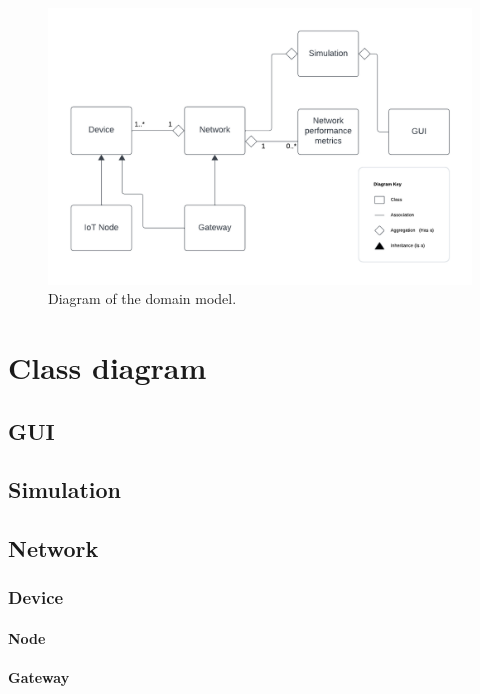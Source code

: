 \begin{figure}[H]
  \centering
  \includegraphics[width=\textwidth]{Domain_model.pdf}
  \caption{Diagram of the domain model.}
  \label{fig:Domain_model}
\end{figure}

\section{Class diagram}

\subsection{GUI}

\subsection{Simulation}

\subsection{Network}

\subsubsection{Device}

\paragraph{Node}

\paragraph{Gateway}



